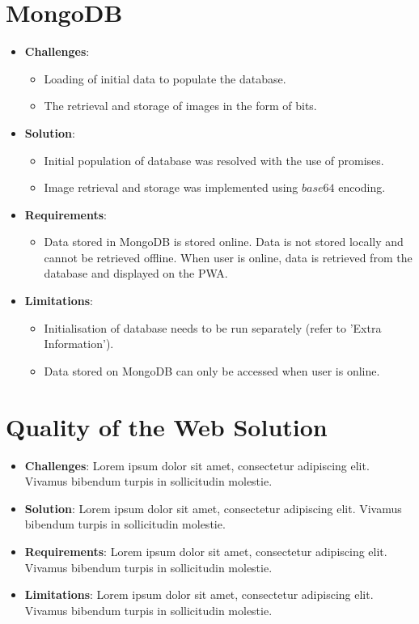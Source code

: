 \documentclass[11pt, a4paper]{article}
\begin{document}
\section{MongoDB}
\begin{itemize}
  \item \textbf{Challenges}:
  \begin{itemize}
    \item Loading of initial data to populate the database.
    \item The retrieval and storage of images in the form of bits.
  \end{itemize}
  \item \textbf{Solution}:
  \begin{itemize}
    \item Initial population of database was resolved with the use of promises.
    \item Image retrieval and storage was implemented using $base64$ encoding.
  \end{itemize}
  \item \textbf{Requirements}:
  \begin{itemize}
    \item Data stored in MongoDB is stored online. Data is not stored locally and cannot be
    retrieved offline. When user is online, data is retrieved from the database and displayed on the
    PWA.
  \end{itemize}
  \item \textbf{Limitations}:
  \begin{itemize}
    \item Initialisation of database needs to be run separately (refer to 'Extra Information').
    \item Data stored on MongoDB can only be accessed when user is online.
  \end{itemize}
\end{itemize}

\section{Quality of the Web Solution}
\begin{itemize}
  \item \textbf{Challenges}: Lorem ipsum dolor sit amet, consectetur adipiscing elit. Vivamus
  bibendum turpis in sollicitudin molestie.
  \item \textbf{Solution}: Lorem ipsum dolor sit amet, consectetur adipiscing elit. Vivamus bibendum
  turpis in sollicitudin molestie.
  \item \textbf{Requirements}: Lorem ipsum dolor sit amet, consectetur adipiscing elit. Vivamus
  bibendum turpis in sollicitudin molestie.
  \item \textbf{Limitations}: Lorem ipsum dolor sit amet, consectetur adipiscing elit. Vivamus
  bibendum turpis in sollicitudin molestie.
\end{itemize}
\end{document}
